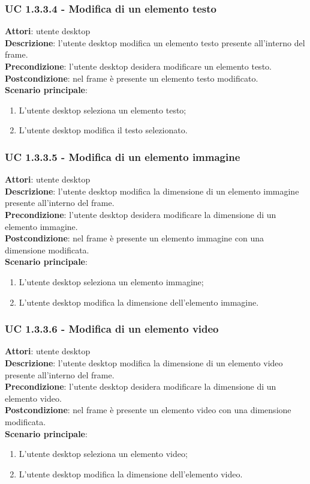 \subsubsection{UC 1.3.3.4 - Modifica di un elemento testo}{
	\label{uc1.3.3.4}
	\textbf{Attori}: utente desktop \\
	\textbf{Descrizione}: l'utente desktop modifica un elemento testo presente all'interno del frame. \\
	\textbf{Precondizione}: l'utente desktop desidera modificare un elemento testo.	\\
	\textbf{Postcondizione}: nel frame è presente un elemento testo modificato.	\\
	\textbf{Scenario principale}:
	\begin{enumerate}
		\item L'utente desktop seleziona un elemento testo;
		\item L'utente desktop modifica il testo selezionato.
	\end{enumerate}
	}
\subsubsection{UC 1.3.3.5 - Modifica di un elemento immagine}{
	\label{uc1.3.3.5}
	\textbf{Attori}: utente desktop \\
	\textbf{Descrizione}: l'utente desktop modifica la dimensione di un elemento immagine presente all'interno del frame. \\
	\textbf{Precondizione}: l'utente desktop desidera modificare la dimensione di un elemento immagine.	\\
	\textbf{Postcondizione}: nel frame è presente un elemento immagine con una dimensione modificata.	\\
	\textbf{Scenario principale}:
	\begin{enumerate}
		\item L'utente desktop seleziona un elemento immagine;
		\item L'utente desktop modifica la dimensione dell'elemento immagine.
	\end{enumerate}
	}
\subsubsection{UC 1.3.3.6 - Modifica di un elemento video}{
	\label{uc1.3.3.6}
	\textbf{Attori}: utente desktop \\
	\textbf{Descrizione}: l'utente desktop modifica la dimensione di un elemento video presente all'interno del frame. \\
	\textbf{Precondizione}: l'utente desktop desidera modificare la dimensione di un elemento video.	\\
	\textbf{Postcondizione}: nel frame è presente un elemento video con una dimensione modificata.	\\
	\textbf{Scenario principale}:
	\begin{enumerate}
		\item L'utente desktop seleziona un elemento video;
		\item L'utente desktop modifica la dimensione dell'elemento video.
	\end{enumerate}
	}
